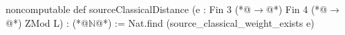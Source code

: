 noncomputable def sourceClassicalDistance (e : Fin 3 (*@$\to$@*) Fin 4 (*@$\to$@*) ZMod L) : (*@$\mathbb N$@*) :=
  Nat.find (source_classical_weight_exists e)
